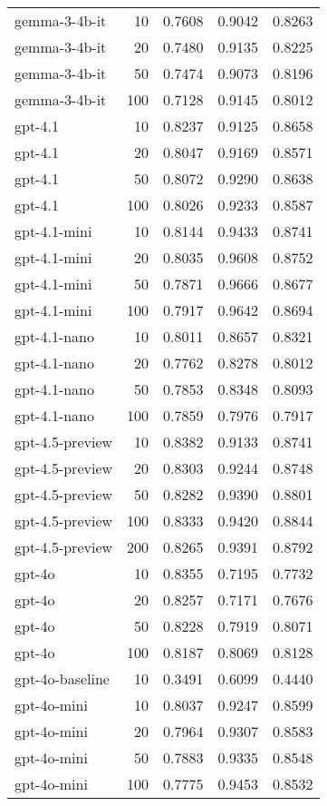 \begin{tabular}{lrrrr}
gemma-3-4b-it & 10 & 0.7608 & 0.9042 & 0.8263 \\
gemma-3-4b-it & 20 & 0.7480 & 0.9135 & 0.8225 \\
gemma-3-4b-it & 50 & 0.7474 & 0.9073 & 0.8196 \\
gemma-3-4b-it & 100 & 0.7128 & 0.9145 & 0.8012 \\
gpt-4.1 & 10 & 0.8237 & 0.9125 & 0.8658 \\
gpt-4.1 & 20 & 0.8047 & 0.9169 & 0.8571 \\
gpt-4.1 & 50 & 0.8072 & 0.9290 & 0.8638 \\
gpt-4.1 & 100 & 0.8026 & 0.9233 & 0.8587 \\
gpt-4.1-mini & 10 & 0.8144 & 0.9433 & 0.8741 \\
gpt-4.1-mini & 20 & 0.8035 & 0.9608 & 0.8752 \\
gpt-4.1-mini & 50 & 0.7871 & 0.9666 & 0.8677 \\
gpt-4.1-mini & 100 & 0.7917 & 0.9642 & 0.8694 \\
gpt-4.1-nano & 10 & 0.8011 & 0.8657 & 0.8321 \\
gpt-4.1-nano & 20 & 0.7762 & 0.8278 & 0.8012 \\
gpt-4.1-nano & 50 & 0.7853 & 0.8348 & 0.8093 \\
gpt-4.1-nano & 100 & 0.7859 & 0.7976 & 0.7917 \\
gpt-4.5-preview & 10 & 0.8382 & 0.9133 & 0.8741 \\
gpt-4.5-preview & 20 & 0.8303 & 0.9244 & 0.8748 \\
gpt-4.5-preview & 50 & 0.8282 & 0.9390 & 0.8801 \\
gpt-4.5-preview & 100 & 0.8333 & 0.9420 & 0.8844 \\
gpt-4.5-preview & 200 & 0.8265 & 0.9391 & 0.8792 \\
gpt-4o & 10 & 0.8355 & 0.7195 & 0.7732 \\
gpt-4o & 20 & 0.8257 & 0.7171 & 0.7676 \\
gpt-4o & 50 & 0.8228 & 0.7919 & 0.8071 \\
gpt-4o & 100 & 0.8187 & 0.8069 & 0.8128 \\
gpt-4o-baseline & 10 & 0.3491 & 0.6099 & 0.4440 \\
gpt-4o-mini & 10 & 0.8037 & 0.9247 & 0.8599 \\
gpt-4o-mini & 20 & 0.7964 & 0.9307 & 0.8583 \\
gpt-4o-mini & 50 & 0.7883 & 0.9335 & 0.8548 \\
gpt-4o-mini & 100 & 0.7775 & 0.9453 & 0.8532 \\

\end{tabular}
